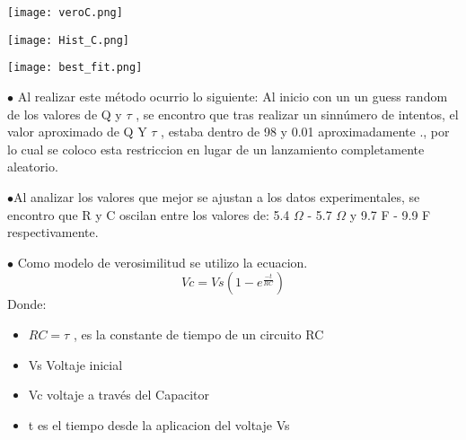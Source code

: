 \documentclass[twoside]{article}
\begin{document}
\begin{centering}
\texttt{[image: veroC.png]}
\end{centering}


\begin{centering}
\texttt{[image: Hist\_C.png]}
\end{centering}



\begin{centering}
\texttt{[image: best\_fit.png]}
\end{centering}


\vspace{5mm}

$\bullet$ Al realizar este método ocurrio lo siguiente:
Al inicio con un un guess random de los valores de Q y $\tau$ , se encontro que tras realizar un sinnúmero de intentos, el valor aproximado de Q Y $\tau$ , estaba dentro de 98 y 0.01 aproximadamente ., por lo cual se coloco esta restriccion en lugar de un lanzamiento completamente aleatorio.

\vspace{5mm}

$\bullet$Al analizar los valores que mejor se ajustan a los datos experimentales, se encontro que R y C oscilan entre los valores de:  5.4 $\Omega$ - 5.7 $\Omega$ y 9.7 F - 9.9 F respectivamente.



$\bullet$ Como modelo de verosimilitud se utilizo la ecuacion.
\begin{equation}
    Vc = Vs(1-e^{\frac{-t}{RC}})
\end{equation}
Donde: 
\begin{itemize}
    \item $RC = \tau $ , es la constante de tiempo de un circuito RC 
    \item Vs Voltaje inicial 
    \item Vc voltaje a través del Capacitor
    \item t es el tiempo desde la aplicacion del voltaje Vs
\end{itemize}
\end{document}
